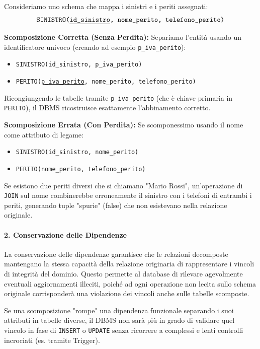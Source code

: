 \begin{example}
Consideriamo uno schema che mappa i sinistri e i periti assegnati: 
$$ \texttt{SINISTRO(\underline{id\_sinistro}, nome\_perito, telefono\_perito)} $$

\textbf{Scomposizione Corretta (Senza Perdita):}
Separiamo l'entità usando un identificatore univoco (creando ad esempio \texttt{p\_iva\_perito}):
\begin{itemize}
    \item \texttt{SINISTRO(id\_sinistro, p\_iva\_perito)}
    \item \texttt{PERITO(\underline{p\_iva\_perito}, nome\_perito, telefono\_perito)}
\end{itemize}
Ricongiungendo le tabelle tramite \texttt{p\_iva\_perito} (che è chiave primaria in \texttt{PERITO}), il DBMS ricostruisce esattamente l'abbinamento corretto.

\textbf{Scomposizione Errata (Con Perdita):}
Se scomponessimo usando il nome come attributo di legame:
\begin{itemize}
    \item \texttt{SINISTRO(id\_sinistro, nome\_perito)}
    \item \texttt{PERITO(nome\_perito, telefono\_perito)}
\end{itemize}
Se esistono due periti diversi che si chiamano "Mario Rossi", un'operazione di \texttt{JOIN} sul nome combinerebbe erroneamente il sinistro con i telefoni di entrambi i periti, generando tuple "spurie" (false) che non esistevano nella relazione originale.
\end{example}

\paragraph{2. Conservazione delle Dipendenze}
La conservazione delle dipendenze garantisce che le relazioni decomposte mantengano la stessa capacità della relazione originaria di rappresentare i vincoli di integrità del dominio. Questo permette al database di rilevare agevolmente eventuali aggiornamenti illeciti, poiché ad ogni operazione non lecita sullo schema originale corrisponderà una violazione dei vincoli anche sulle tabelle scomposte.

Se una scomposizione "rompe" una dipendenza funzionale separando i suoi attributi in tabelle diverse, il DBMS non sarà più in grado di validare quel vincolo in fase di \texttt{INSERT} o \texttt{UPDATE} senza ricorrere a complessi e lenti controlli incrociati (es. tramite Trigger).

